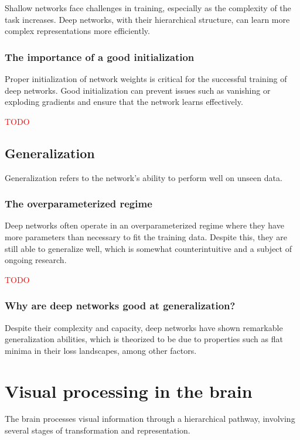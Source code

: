 \documentclass[11pt]{book} %
\begin{document}
Shallow networks face challenges in training, especially as the complexity of the task increases. 
Deep networks, with their hierarchical structure, can learn more complex representations more efficiently.

\subsubsection{The importance of a good initialization}
Proper initialization of network weights is critical for the successful training of deep networks. 
Good initialization can prevent issues such as vanishing or exploding gradients and ensure that the network learns effectively.

\textcolor{red}{TODO}


\subsection{Generalization}
Generalization refers to the network's ability to perform well on unseen data.

\subsubsection{The overparameterized regime}
Deep networks often operate in an overparameterized regime where they have more parameters than necessary to fit the training data. 
Despite this, they are still able to generalize well, which is somewhat counterintuitive and a subject of ongoing research.

\textcolor{red}{TODO}


\subsubsection{Why are deep networks good at generalization?}
Despite their complexity and capacity, deep networks have shown remarkable generalization abilities,
 which is theorized to be due to properties such as flat minima in their loss landscapes, among other factors.

\section{Visual processing in the brain}
The brain processes visual information through a hierarchical pathway, involving several stages of transformation and representation.
\end{document}

